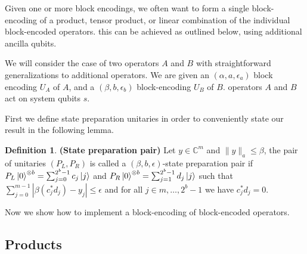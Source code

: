 \documentclass[12pt, oneside]{book}
\theoremstyle{definition}
\newtheorem{definition}{Definition}[section]
\theoremstyle{definition}
\theoremstyle{remark}
\begin{document}
Given one or more block encodings, we often want to form a single block-encoding of a product, tensor product, or linear combination of the individual block-encoded operators. this can be achieved as outlined below, using additional ancilla qubits.

We will consider the case of two operators $A$ and $B$ with straightforward generalizations to additional operators. We are given an $(\alpha,a,\epsilon_a)$ block encoding $U_A$ of $A$, and a $(\beta,b,\epsilon_b)$ block-encoding $U_B$ of $B$. operators $A$ and $B$ act on system qubits $s$.

First we define state preparation unitaries in order to conveniently state our result in the following lemma.
\begin{definition}
    \textbf{(State preparation pair)} Let $y\in\mathbb{C}^m$ and $\|y\|_a\leq \beta$, the pair of unitaries $(P_L,P_R)$ is called a $(\beta,b,\epsilon)$-state preparation pair if $P_L\ket{0}^{\otimes b}=\sum_{j=0}^{2^b-1}c_j\ket{j}$ and $P_R\ket{0}^{\otimes b}=\sum_{j=1}^{2^b-1}d_j\ket{j}$ such that $\sum_{j=0}^{m-1}|\beta(c_j^* d_j)-y_j|\leq\epsilon$ and for all $j\in m,\ldots,2^b-1$ we have $c_j^*d_j=0$.
\end{definition}
Now we show how to implement a block-encoding of block-encoded operators.

\subsection{Products}
\end{document}
